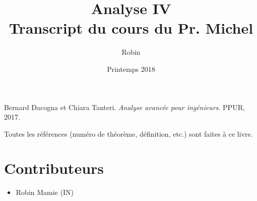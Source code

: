 \documentclass[a4paper, 11pt]{report}
\title{\textbf{Analyse IV} \\
Transcript du cours du Pr. Michel \bsc{Cibils}}
\author{Robin \bsc{Mamié}}
\date{Printemps 2018}
\theoremstyle{definition}
\theoremstyle{remark}
\begin{document}
\maketitle

\tableofcontents




\begin{thebibliography}{9}
    Bernard Dacogna et Chiara Tanteri. 
    \textit{Analyse avancée pour ingénieurs}. 
    PPUR, 2017.
\end{thebibliography}

Toutes les références (numéro de théorème, définition, etc.) sont faites à ce livre.

\section*{Contributeurs}

\begin{itemize}
    \item Robin Mamie (IN)
\end{itemize}
\end{document}
